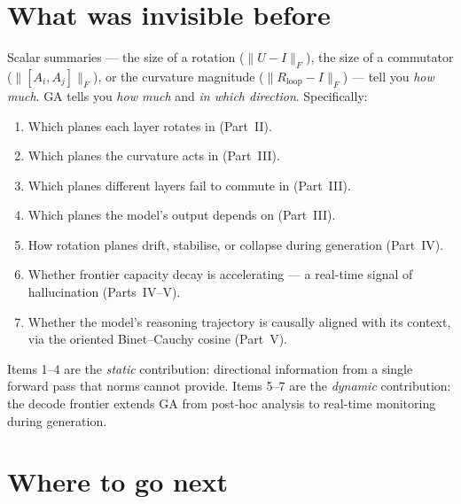 \documentclass[11pt, twoside, openright]{memoir}
\numberwithin{equation}{chapter}
\begin{document}
\section{What was invisible before}

Scalar summaries --- the size of a rotation ($\|U - I\|_F$), the size
of a commutator ($\|[A_i, A_j]\|_F$), or the curvature magnitude
($\|R_{\text{loop}} - I\|_F$) --- tell you \emph{how much}.  GA tells you
\emph{how much} and \emph{in which direction}.  Specifically:

\begin{enumerate}[nosep]
\item Which planes each layer rotates in (Part~II).
\item Which planes the curvature acts in (Part~III).
\item Which planes different layers fail to commute in (Part~III).
\item Which planes the model's output depends on (Part~III).
\item How rotation planes drift, stabilise, or collapse during
  generation (Part~IV).
\item Whether frontier capacity decay is accelerating --- a real-time
  signal of hallucination (Parts~IV--V).
\item Whether the model's reasoning trajectory is causally aligned
  with its context, via the oriented Binet--Cauchy cosine (Part~V).
\end{enumerate}

Items 1--4 are the \emph{static} contribution: directional information
from a single forward pass that norms cannot provide.  Items 5--7 are
the \emph{dynamic} contribution: the decode frontier extends GA from
post-hoc analysis to real-time monitoring during generation.

\section{Where to go next}
\end{document}

